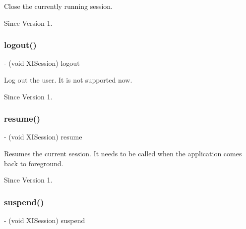 Close the currently running session. 

\begin{DoxySince}{Since}
Version 1. 
\end{DoxySince}
\hypertarget{protocol_x_i_session_01-p_a614f196c8dc33e050e0635bfafbfee4d}{}\label{protocol_x_i_session_01-p_a614f196c8dc33e050e0635bfafbfee4d} 
\subsubsection{\texorpdfstring{logout()}{logout()}}
{\footnotesize\ttfamily -\/ (void X\+I\+Session) logout \begin{DoxyParamCaption}{ }\end{DoxyParamCaption}}



Log out the user. It is not supported now. 

\begin{DoxySince}{Since}
Version 1. 
\end{DoxySince}
\hypertarget{protocol_x_i_session_01-p_a9808406f72e19472b687769dc01886c3}{}\label{protocol_x_i_session_01-p_a9808406f72e19472b687769dc01886c3} 
\subsubsection{\texorpdfstring{resume()}{resume()}}
{\footnotesize\ttfamily -\/ (void X\+I\+Session) resume \begin{DoxyParamCaption}{ }\end{DoxyParamCaption}}



Resumes the current session. It needs to be called when the application comes back to foreground. 

\begin{DoxySince}{Since}
Version 1. 
\end{DoxySince}
\hypertarget{protocol_x_i_session_01-p_ac2e106468605a7b34c07a5a156c13f34}{}\label{protocol_x_i_session_01-p_ac2e106468605a7b34c07a5a156c13f34} 
\subsubsection{\texorpdfstring{suspend()}{suspend()}}
{\footnotesize\ttfamily -\/ (void X\+I\+Session) suspend \begin{DoxyParamCaption}{ }\end{DoxyParamCaption}}



